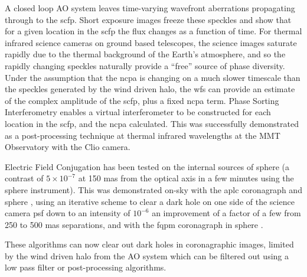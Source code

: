 \documentclass[letterpaper]{ar-1col}
\newcommand{\notebooksuggestion}[1]{\textcolor{blue}{[Notebook: #1]}}
\begin{document}
A closed loop AO system leaves time-varying wavefront aberrations propagating through to the \ac{scfp}.
%
Short exposure images freeze these speckles and show that for a given location in the \ac{scfp} the flux changes as a function of time.
%
For thermal infrared science cameras on ground based telescopes, the science images saturate rapidly due to the thermal background of the Earth's atmosphere, and so the rapidly changing speckles naturally provide a ``free'' source of phase diversity.
%
Under the assumption that the \ac{ncpa} is changing on a much slower timescale than the speckles generated by the wind driven halo, the \ac{wfs} can provide an estimate of the complex amplitude of the \ac{scfp}, plus a fixed \ac{ncpa} term.
%
Phase Sorting Interferometry \citep[PSI; ][]{Codona13} enables a virtual interferometer to be constructed for each location in the \ac{scfp}, and the \ac{ncpa} calculated.
%
This was successfully demonstrated as a post-processing technique at thermal infrared wavelengths at the MMT Observatory with the Clio camera.

Electric Field Conjugation has been tested on the internal sources of \ac{sphere} (a contrast of $5\times 10^{-7}$ at 150 mas from the optical axis in a few minutes using the \ac{sphere} instrument).
%
This was demonstrated on-sky with the \ac{aplc} coronagraph and \ac{sphere} \citep{Potier20,Potier22}, using an iterative scheme to clear a dark hole on one side of the science camera \ac{psf} down to an intensity of $10^{-6}$ an improvement of a factor of a few from 250 to 500 mas separations, and with the \ac{fqpm} coronagraph in \ac{sphere} \citep{Galicher24}.


These algorithms can now clear out dark holes in coronagraphic images, limited by the wind driven halo from the AO system which can be filtered out using a low pass filter or post-processing algorithms.





\end{document}
